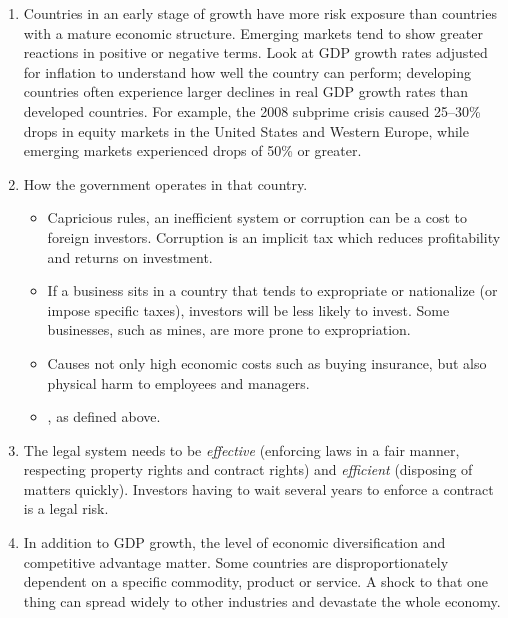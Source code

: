 \begin{enumerate}
\item {} Countries in an early stage of growth
have more risk exposure than countries with a mature economic structure. Emerging
markets tend to show greater reactions in positive or negative terms. Look at GDP
growth rates adjusted for inflation to understand how well the country can
perform; developing countries often experience larger declines in real GDP growth
rates than developed countries. For example, the 2008 subprime crisis caused
25--30\% drops in equity markets in the United States and Western Europe, while
emerging markets experienced drops of 50\% or greater.
\item {} How the government operates in that country.
  \begin{itemize}
  \item {} Capricious rules, an inefficient system
  or corruption can be a cost to foreign investors. Corruption is an implicit tax
  which reduces profitability and returns on investment.
  \item {} If a business sits in a
  country that tends to expropriate or nationalize (or impose specific taxes),
  investors will be less likely to invest. Some businesses, such as mines, are
  more prone to expropriation.
  \item {} Causes not only high economic costs such as
  buying insurance, but also physical harm to employees and managers.
  \item {}, as defined above.
  \end{itemize}
\item {} The legal system needs to be \emph{effective} (enforcing
laws in a fair manner, respecting property rights and contract rights) and
\emph{efficient} (disposing of matters quickly). Investors having to wait several
years to enforce a contract is a legal risk.
\item {} In addition to GDP growth, the level of economic
diversification and competitive advantage matter. Some countries are
disproportionately dependent on a specific commodity, product or service. A shock
to that one thing can spread widely to other industries and devastate the whole
economy.
\end{enumerate}


